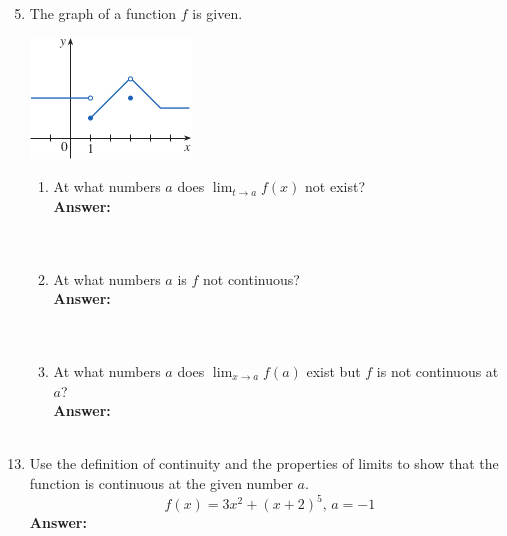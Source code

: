 \documentclass[12pt]{article}
\begin{document}
\newpage
\begin{enumerate}
\setcounter{enumi}{4}
    \item The graph of a function $f$ is given.
    \begin{center}
        \includegraphics{Images/Image-3.png}
    \end{center}
    \begin{enumerate}
        \item At what numbers $a$ does ${\displaystyle\lim_{t\to a} f(x)}$ not exist?\\
        \textbf{Answer: }\\~\\
        \noindent{}
        \\
        \item At what numbers $a$ is $f$ not continuous?\\
        \textbf{Answer: }\\~\\
        \noindent{}
        \\
        \item At what numbers $a$ does ${\displaystyle\lim_{x \to a} f(a)}$ exist but $f$ is not continuous at $a$?\\
        \textbf{Answer: }\\~\\
        \noindent{}
    \end{enumerate}
\end{enumerate}

\begin{enumerate}
\setcounter{enumi}{12}
    \item Use the definition of continuity and the properties of limits to show that the function is continuous at the given number $a$.
    \[ f(x) = 3x^2 + (x+2)^5 \text{, } a = -1\]
    \textbf{Answer: }\\~\\
    \noindent{}
\end{enumerate}
\end{document}
